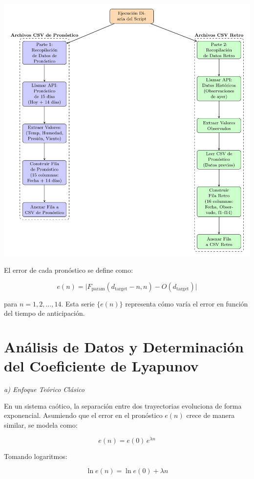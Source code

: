 \documentclass[
  11pt,
  a4paper,
  DIV=11,
  numbers=noendperiod]{scrreprt}
\begin{document}
\includegraphics[width=1\linewidth,height=\textheight,keepaspectratio]{03-meteorologia/EjecucionDiaria.png}

El error de cada pronóstico se define como:

\[
e(n) = \bigl| F_{\text{param}}(d_{\text{target}}-n, n) - O(d_{\text{target}}) \bigr|
\]

para \(n = 1,2,\dots,14\). Esta serie \(\{e(n)\}\) representa cómo varía
el error en función del tiempo de anticipación.

\section{Análisis de Datos y Determinación del Coeficiente de
Lyapunov}\label{anuxe1lisis-de-datos-y-determinaciuxf3n-del-coeficiente-de-lyapunov}

\emph{a) Enfoque Teórico Clásico}

En un sistema caótico, la separación entre dos trayectorias evoluciona
de forma exponencial. Asumiendo que el error en el pronóstico \(e(n)\)
crece de manera similar, se modela como:

\[
e(n) = e(0)\, e^{\lambda n}
\]

Tomando logaritmos:

\[
\ln e(n) = \ln e(0) + \lambda n
\]
\end{document}
